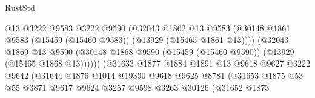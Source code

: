 \begin{lexlean}{RustStd}
\begin{coremodule}
                                          @13
                                          @3222
                                          @9583
                                          @3222
                                          @9590
                                          (@32043
                                            @1862
                                            @13
                                            @9583
                                            (@30148
                                              @1861
                                              @9583
                                              (@15459 (@15460 @9583))
                                              (@13929 (@15465 @1861 @13))))
                                          (@32043
                                            @1869
                                            @13
                                            @9590
                                            (@30148
                                              @1868
                                              @9590
                                              (@15459 (@15460 @9590))
                                              (@13929 (@15465 @1868 @13))))))
                                      (@31633
                                        @1877
                                        @1884
                                        @1891
                                        @13
                                        @9618
                                        @9627
                                        @3222
                                        @9642
                                        (@31644
                                          @1876
                                          @1014
                                          @19390
                                          @9618
                                          @9625
                                          @8781
                                          (@31653
                                            @1875
                                            @53
                                            @55
                                            @3871
                                            @9617
                                            @9624
                                            @3257
                                            @9598
                                            @3263
                                            @30126
                                            (@31652
                                              @1873

\end{coremodule}
\end{lexlean}

